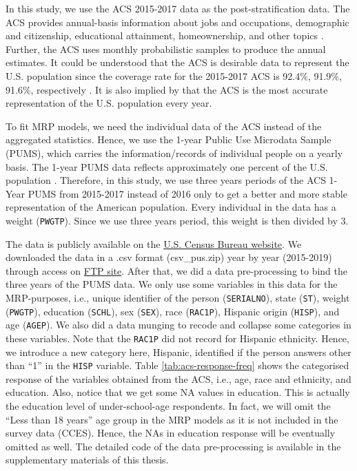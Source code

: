 \documentclass{monashthesis}
\begin{document}
In this study, we use the ACS 2015-2017 data as the post-stratification data. The ACS provides annual-basis information about jobs and occupations, demographic and citizenship, educational attainment, homeownership, and other topics \autocite{acs_data_about}. Further, the ACS uses monthly probabilistic samples to produce the annual estimates. It could be understood that the ACS is desirable data to represent the U.S. population since the coverage rate for the 2015-2017 ACS is 92.4\%, 91.9\%, 91.6\%, respectively \autocite{acs_coverage_rate}. It is also implied by \textcite{GaoYuxiang2021IMRa} that the ACS is the most accurate representation of the U.S. population every year.

To fit MRP models, we need the individual data of the ACS instead of the aggregated statistics. Hence, we use the 1-year Public Use Microdata Sample (PUMS), which carries the information/records of individual people on a yearly basis. The 1-year PUMS data reflects approximately one percent of the U.S. population \autocite{pums_metadata}. Therefore, in this study, we use three years periods of the ACS 1-Year PUMS from 2015-2017 instead of 2016 only to get a better and more stable representation of the American population. Every individual in the data has a weight (\texttt{PWGTP}). Since we use three years period, this weight is then divided by 3.

The data is publicly available on the \href{https://www.census.gov/programs-surveys/acs/microdata/access.2015.html}{U.S. Census Bureau website}. We downloaded the data in a .csv format (csv\_pus.zip) year by year (2015-2019) through access on \href{https://www2.census.gov/programs-surveys/acs/data/pums/2015/1-Year/}{FTP site}. After that, we did a data pre-processing to bind the three years of the PUMS data. We only use some variables in this data for the MRP-purposes, i.e., unique identifier of the person (\texttt{SERIALNO}), state (\texttt{ST}), weight (\texttt{PWGTP}), education (\texttt{SCHL}), sex (\texttt{SEX}), race (\texttt{RAC1P}), Hispanic origin (\texttt{HISP}), and age (\texttt{AGEP}). We also did a data munging to recode and collapse some categories in these variables. Note that the \texttt{RAC1P} did not record for Hispanic ethnicity. Hence, we introduce a new category here, Hispanic, identified if the person answers other than ``1'' in the \texttt{HISP} variable. Table \ref{tab:acs-response-freq} shows the categorised response of the variables obtained from the ACS, i.e., age, race and ethnicity, and education. Also, notice that we get some NA values in education. This is actually the education level of under-school-age respondents. In fact, we will omit the ``Less than 18 years'' age group in the MRP models as it is not included in the survey data (CCES). Hence, the NAs in education response will be eventually omitted as well. The detailed code of the data pre-processing is available in the supplementary materials of this thesis.
\end{document}
